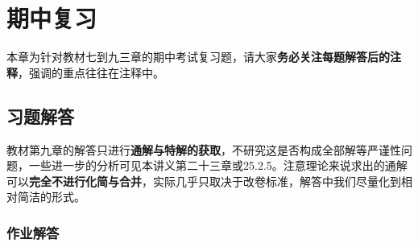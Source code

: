 \documentclass[a4paper,UTF8,fontset=windows,AutoFakeBold]{ctexart}
\newcommand*{\note}{\noindent *}
\theoremstyle{ex}
\begin{document}
\newpage
\section{期中复习}
本章为针对教材七到九三章的期中考试复习题，请大家\textbf{务必关注每题解答后的注释}，强调的重点往往在注释中。

\subsection{习题解答}
\note 教材第九章的解答只进行\textbf{通解与特解的获取}，不研究这是否构成全部解等严谨性问题，一些进一步的分析可见本讲义第二十三章或25.2.5。注意理论来说求出的通解可以\textbf{完全不进行化简与合并}，实际几乎只取决于改卷标准，解答中我们尽量化到相对简洁的形式。

\subsubsection{作业解答}
\end{document}

